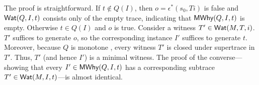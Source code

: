 The proof is straightforward.
%
If $t \notin Q(I)$, then $o = \epsilon^*(s_0, Ti)$ is false and $\textsf{Wat}(Q, I, t)$
consists only of the empty trace, indicating that $\textsf{MWhy}(Q, I, t)$ is empty.
%
Otherwise $t \in Q(I)$ and $o$ is true. 
Consider a witness $T' \in \textsf{Wat}(M, T,
i)$. $T'$ suffices to generate $o$, so the corresponding instance $I'$ suffices
to generate $t$. Moreover, because $Q$ is monotone , every witness $T'$ is
closed under supertrace in $T'$. Thus, $T'$ (and hence $I'$) is a minimal
witness. The proof of the converse---showing that every $I' \in \textsf{MWhy}(Q, I, t)$
has a corresponding subtrace $T' \in \textsf{Wat}(M, I, t)$---is almost identical.

